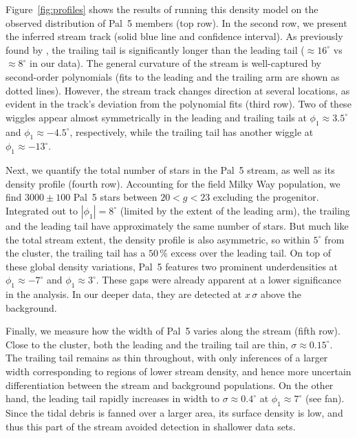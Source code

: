\documentclass[twocolumn]{aastex62}
\begin{document}
Figure~\ref{fig:profiles} shows the results of running this density model on the observed distribution of Pal~5 members (top row).
In the second row, we present the inferred stream track (solid blue line and confidence interval).
As previously found by \citet{Bernard:2016}, the trailing tail is significantly longer than the leading tail ($\approx16^\circ$ vs $\approx8^\circ$ in our data). 
The general curvature of the stream is well-captured by second-order polynomials (fits to the leading and the trailing arm are shown as dotted lines).
However, the stream track changes direction at several locations, as evident in the track's deviation from the polynomial fits (third row).
Two of these wiggles appear almost symmetrically in the leading and trailing tails at $\phi_1\approx3.5^\circ$ and $\phi_1\approx-4.5^\circ$, respectively, while the trailing tail has another wiggle at $\phi_1\approx-13^\circ$.

Next, we quantify the total number of stars in the Pal~5 stream, as well as its density profile (fourth row).
Accounting for the field Milky Way population, we find $3000\pm100$ Pal~5 stars between $20<g<23$ excluding the progenitor.
Integrated out to $|\phi_1|=8^\circ$ (limited by the extent of the leading arm), the trailing and the leading tail have approximately the same number of stars.
But much like the total stream extent, the density profile is also asymmetric, so within $5^\circ$ from the cluster, the trailing tail has a $50\,\%$ excess over the leading tail.
On top of these global density variations, Pal~5 features two prominent underdensities at $\phi_1\approx-7^\circ$ and $\phi_1\approx3^\circ$.
These gaps were already apparent at a lower significance in the \citet{Erkal:2016} analysis.
In our deeper data, they are detected at $x\,\sigma$ above the background.

Finally, we measure how the width of Pal~5 varies along the stream (fifth row).
Close to the cluster, both the leading and the trailing tail are thin, $\sigma\approx0.15^\circ$.
The trailing tail remains as thin throughout, with only inferences of a larger width corresponding to regions of lower stream density, and hence more uncertain differentiation between the stream and background populations.
On the other hand, the leading tail rapidly increases in width to $\sigma\approx0.4^\circ$ at $\phi_1\approx7^\circ$ (see fan).
Since the tidal debris is fanned over a larger area, its surface density is low, and thus this part of the stream avoided detection in shallower data sets.
\end{document}
